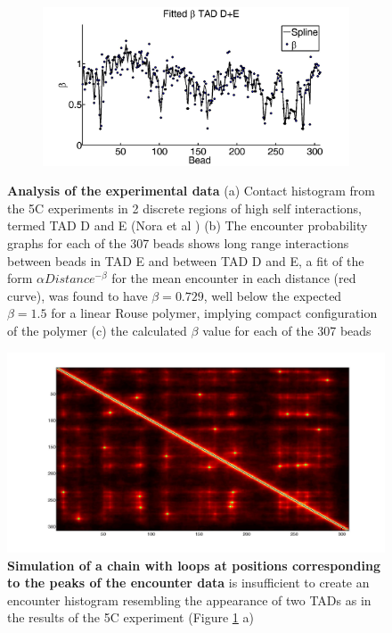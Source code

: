 \documentclass[12pt]{article}
\begin{document}
\begin{figure}[H]
\begin{subfigure}[b]{0.1\textwidth}
\includegraphics[scale=0.16]{fittedExpValuesWithSplineAverageTADDAndE}
\caption{}
\end{subfigure}

\caption{\textbf{Analysis of the experimental data} (a) Contact histogram from the 5C experiments in 2 discrete regions of high self interactions, termed TAD D and E (Nora et al \cite{Nora2012}) (b) The encounter probability graphs for each of the 307 beads shows long range interactions between beads in TAD E and between TAD D and E, a fit of the form $\alpha Distance ^{-\beta}$ for the mean encounter in each distance (red curve), was found to have $\beta=0.729$, well below the expected $\beta=1.5$ for a linear Rouse polymer, implying compact configuration of the polymer (c) the calculated $\beta$ value for each of the 307 beads}
\label{figure_TADDAndENoraEtAl2012}
\end{figure}


\begin{figure}[H]
\includegraphics[scale=0.2]{meanEncounterMatrixOfSimulatingTADEandDWithLoops}
\caption{\textbf{Simulation of a chain with loops at positions corresponding to the peaks of the encounter data} is insufficient to create an encounter histogram resembling the appearance of two TADs as in the results of the 5C experiment (Figure \ref{figure_TADDAndENoraEtAl2012} a) }
\label{figure_encounterProbabilityPeaksOfTheEncounterData}
\end{figure}
\end{document}
